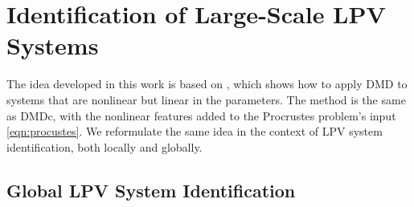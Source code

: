 
\section{Identification of Large-Scale LPV Systems} \label{sec:dmd_lpv}

The idea developed in this work is based on \cite{Gosea2021}, which shows how to apply DMD to systems that are nonlinear but linear in the parameters.
%
The method is the same as DMDc, with the nonlinear features added to the Procrustes problem's input \eqref{eqn:procustes}.
%
We reformulate the same idea in the context of LPV system identification, both locally and globally.


\subsection{Global LPV System Identification} \label{subsec:Glb-LPV}

